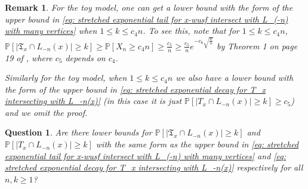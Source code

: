 \documentclass[12pt]{article}
\newtheorem{question}[theorem]{Question}
\newtheorem{remark}[theorem]{Remark}
\numberwithin{equation}{section}
\newcommand{\1}{\mathbf{1}}
\begin{document}
\begin{remark}
For the toy model, one can get a lower bound with the form of the upper bound in \eqref{eq: stretched exponential tail for x-wusf intersect with L_(-n) with many vertices}  when $1\leq k\leq c_4 n$.  To see this, note that for $1\leq k\leq c_4 n$, $\mathbb{P}[|\mathfrak{T}_x\cap L_{-n}(x)|\geq k]\geq \mathbb{P}[X_n\geq c_4n]\geq \frac{c_5}{n}\geq \frac{c_5}{n} e^{-c_6\sqrt{\frac{k}{n}}}$ by Theorem 1 on page 19 of \cite{AthreyaNey1972}, where $c_5$ depends on $c_4$.

	Similarly for the toy model,  when $1\leq k\leq c_4 n$ we also have a lower bound with the form of  the upper bound in \eqref{eq: stretched exponential decay for T_x intersecting with L_-n(x)} (in this case it is just $\mathbb{P}[|T_x\cap L_{-n}(x)|\geq k]\geq c_5$) and we omit the proof.  
 \end{remark}
\begin{question}
	Are there lower bounds for $\mathbb{P}[|\mathfrak{T}_x\cap L_{-n}(x)|\geq k]$  and $\mathbb{P}[|T_x\cap L_{-n}(x)|\geq k]$  with the same form as the upper bound in \eqref{eq: stretched exponential tail for x-wusf intersect with L_(-n) with many vertices} and \eqref{eq: stretched exponential decay for T_x intersecting with L_-n(x)} respectively for all $n,k\geq 1$? 
\end{question}
\end{document}
